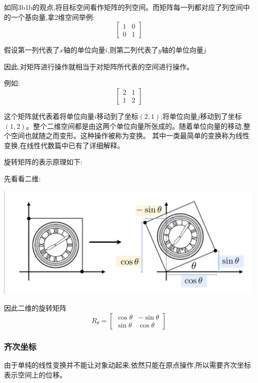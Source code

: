 \documentclass[UTF8]{ctexbook}
\begin{document}
{{{      如同3b1b的观点,将目标空间看作矩阵的列空间。而矩阵每一列都对应了列空间中的一个基向量,拿2维空间举例:
      $$\left[\begin{matrix}
            1 & 0 \\
            0 & 1
          \end{matrix}\right]$$

      假设第一列代表了$x$轴的单位向量$i$,则第二列代表了$y$轴的单位向量$j$

      因此,对矩阵进行操作就相当于对矩阵所代表的空间进行操作。

      例如:$$\left[\begin{matrix}
            2 & 1 \\
            1 & 2
          \end{matrix}\right]$$

      这个矩阵就代表着将单位向量$i$移动到了坐标$(2,1)$,将单位向量$j$移动到了坐标$(1,2)$。整个二维空间都是由这两个单位向量所张成的。随着单位向量的移动,整个空间也就随之而变形。这种操作被称为变换。
      其中一类最简单的变换称为线性变换,在线性代数篇中已有了详细解释。

      旋转矩阵的表示原理如下:

      先看看二维:

      \includegraphics[scale=0.25]{resources/rotateMatrixGraphics.png}

      因此二维的旋转矩阵$$R_\theta = \left[\begin{matrix}
            \cos\theta & -\sin\theta \\
            \sin\theta & \cos\theta
          \end{matrix}\right]$$


      \subsubsection{齐次坐标}{
        由于单纯的线性变换并不能让对象动起来,依然只能在原点操作,所以需要齐次坐标表示空间上的位移。

}}}}
\end{document}

